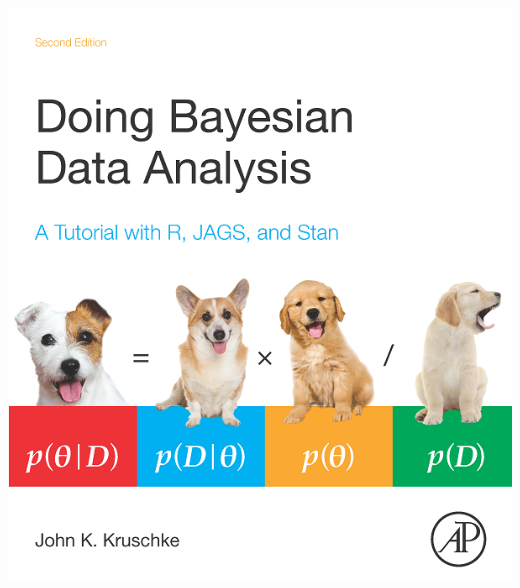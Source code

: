 \documentclass[
  ignorenonframetext,
  aspectratio=169]{beamer}
\begin{document}
\begin{frame}
\begin{center}\includegraphics[width=8.33in]{img/kruschke} \end{center}
\end{frame}
\end{document}

